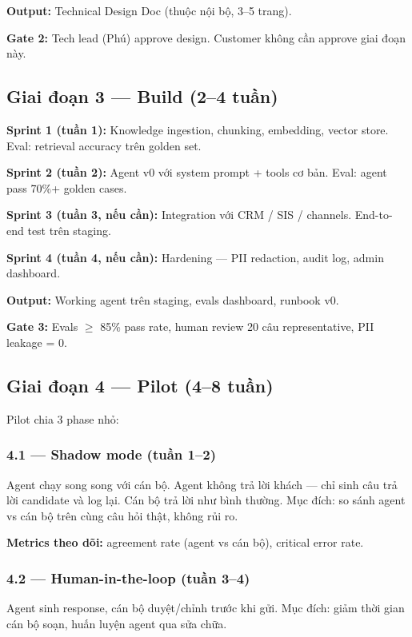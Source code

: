 \documentclass[11pt,a4paper]{article}
\begin{document}
\textbf{Output:} Technical Design Doc (thuộc nội bộ, 3--5 trang).

\textbf{Gate 2:} Tech lead (Phú) approve design. Customer không cần approve giai đoạn này.

\subsection{Giai đoạn 3 — Build (2--4 tuần)}

\textbf{Sprint 1 (tuần 1):} Knowledge ingestion, chunking, embedding, vector store. Eval: retrieval accuracy trên golden set.

\textbf{Sprint 2 (tuần 2):} Agent v0 với system prompt + tools cơ bản. Eval: agent pass 70\%+ golden cases.

\textbf{Sprint 3 (tuần 3, nếu cần):} Integration với CRM / SIS / channels. End-to-end test trên staging.

\textbf{Sprint 4 (tuần 4, nếu cần):} Hardening --- PII redaction, audit log, admin dashboard.

\textbf{Output:} Working agent trên staging, evals dashboard, runbook v0.

\textbf{Gate 3:} Evals $\geq$ 85\% pass rate, human review 20 câu representative, PII leakage = 0.

\subsection{Giai đoạn 4 — Pilot (4--8 tuần)}

Pilot chia 3 phase nhỏ:

\subsubsection*{4.1 --- Shadow mode (tuần 1--2)}

Agent chạy song song với cán bộ. Agent không trả lời khách --- chỉ sinh câu trả
lời candidate và log lại. Cán bộ trả lời như bình thường. Mục đích: so sánh agent
vs cán bộ trên cùng câu hỏi thật, không rủi ro.

\textbf{Metrics theo dõi:} agreement rate (agent vs cán bộ), critical error rate.

\subsubsection*{4.2 --- Human-in-the-loop (tuần 3--4)}

Agent sinh response, cán bộ duyệt/chỉnh trước khi gửi. Mục đích: giảm thời gian
cán bộ soạn, huấn luyện agent qua sửa chữa.
\end{document}
